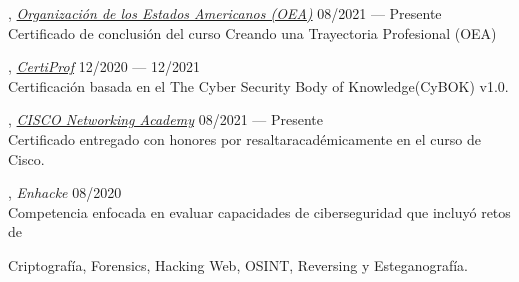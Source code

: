 
, \textit{\href{https://drive.google.com/file/d/1ZyKPYFQNQdr4LqrcaTaxvvGPIQRri95_/view?usp=sharing}{Organización de los Estados Americanos (OEA)}}	\hfill 08/2021 --- Presente
\\
Certiﬁcado de conclusión del curso Creando una Trayectoria Profesional (OEA)

, \textit{\href{https://drive.google.com/file/d/1BPJ2z9QbTqC9g5F9bGgSnBx9Cdecsg8K/view?usp=sharing}{CertiProf}} \hfill 12/2020 --- 12/2021
\\
Certiﬁcación basada en el The Cyber Security Body of Knowledge(CyBOK) v1.0.

, \textit{\href{https://drive.google.com/file/d/14mfb80HYq8jOKPCfCkIlJ3gAVB0d1Bm4/view?usp=sharing}{CISCO Networking Academy}} \hfill 08/2021 --- Presente
\\
Certiﬁcado entregado con honores por resaltaracadémicamente en el curso de Cisco.

, \textit{Enhacke} \hfill 08/2020
\\
Competencia enfocada en evaluar capacidades de ciberseguridad que incluyó retos de 

Criptografía, Forensics, Hacking Web, OSINT, Reversing y Esteganografía.